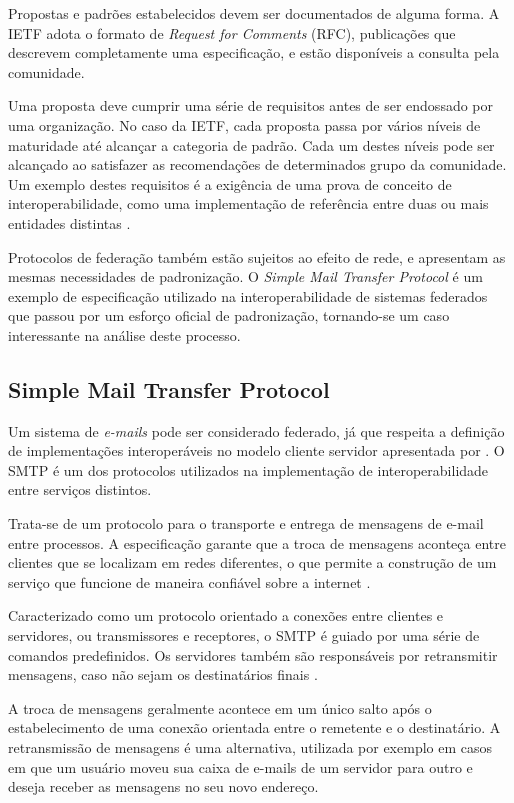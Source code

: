 Propostas e padrões estabelecidos devem ser documentados de alguma forma. A IETF
adota o formato de \textit{Request for Comments} (RFC), publicações que descrevem
completamente uma especificação, e estão disponíveis a consulta pela comunidade.

Uma proposta deve cumprir uma série de requisitos antes de ser endossado por uma
organização. No caso da IETF, cada proposta passa por vários níveis de maturidade
até alcançar a categoria de padrão. Cada um destes níveis pode ser alcançado ao
satisfazer as recomendações de determinados grupo da comunidade. Um exemplo destes
requisitos é a exigência de uma prova de conceito de interoperabilidade, como uma
implementação de referência entre duas ou mais entidades distintas \cite{rfc1280}.

Protocolos de federação também estão sujeitos ao efeito de rede, e apresentam as
mesmas necessidades de padronização. O \textit{Simple Mail Transfer Protocol} é um
exemplo de especificação utilizado na interoperabilidade de sistemas federados que
passou por um esforço oficial de padronização, tornando-se um caso interessante na
análise deste processo.


\subsection{Simple Mail Transfer Protocol}

\begin{sloppypar}
Um sistema de \textit{e-mails} pode ser considerado federado, já que respeita a
definição de implementações interoperáveis no modelo cliente servidor apresentada
por \cite{barocas2012}. O SMTP é um dos protocolos utilizados na implementação de
interoperabilidade entre serviços distintos.
\end{sloppypar}

Trata-se de um protocolo para o transporte e entrega de mensagens de e-mail entre
processos. A especificação garante que a troca de mensagens aconteça entre clientes
que se localizam em redes diferentes, o que permite a construção de um serviço que
funcione de maneira confiável sobre a internet \cite{rfc2821}.

Caracterizado como um protocolo orientado a conexões entre clientes e servidores, ou
transmissores e receptores, o SMTP é guiado por uma série de comandos predefinidos.
Os servidores também são responsáveis por retransmitir mensagens, caso não sejam os
destinatários finais \cite{kurose2012}.

A troca de mensagens geralmente acontece em um único salto após o estabelecimento de
uma conexão orientada entre o remetente e o destinatário. A retransmissão de
mensagens é uma alternativa, utilizada por exemplo em casos em que um usuário moveu
sua caixa de e-mails de um servidor para outro e deseja receber as mensagens no seu
novo endereço.


